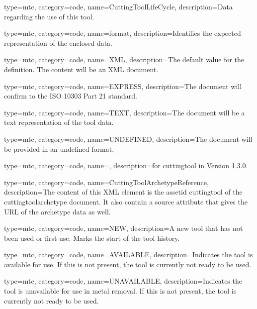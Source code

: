 {
  type=mtc,
  category=code,
  name={CuttingToolLifeCycle},
  description={Data regarding the use of this tool.}
}


{
  type=mtc,
  category=code,
  name={format},
  description={Identifies the expected representation of the enclosed data.}
}


{
  type=mtc,
  category=code,
  name={XML},
  description={The default value for the definition. The content will be an XML document.}
}


{
  type=mtc,
  category=code,
  name={EXPRESS},
  description={The document will confirm to the ISO 10303 Part 21 standard.}
}


{
  type=mtc,
  category=code,
  name={TEXT},
  description={The document will be a text representation of the tool data.}
}


{
  type=mtc,
  category=code,
  name={UNDEFINED},
  description={The document will be provided in an undefined format.}
}


{
  type=mtc,
  category=code,
  name=,
  description={\DEPRECATED for \gls{cuttingtool} in Version 1.3.0.   \newline {}}
}


{
  type=mtc,
  category=code,
  name={CuttingToolArchetypeReference},
  description={The content of this XML element is the \gls{assetid cuttingtool} of the \gls{cuttingtoolarchetype} document. It \MAY also contain a source attribute that gives the URL of the archetype data as well.}
}


{
  type=mtc,
  category=code,
  name={NEW},
  description={A new tool that has not been used or first use. Marks the start of the tool history.}
}


{
  type=mtc,
  category=code,
  name={AVAILABLE},
  description={Indicates the tool is available for use. If this is not present, the tool is currently not ready to be used.}
}


{
  type=mtc,
  category=code,
  name={UNAVAILABLE},
  description={Indicates the tool is unavailable for use in metal removal. If this is not present, the tool is currently not ready to be used.}
}


